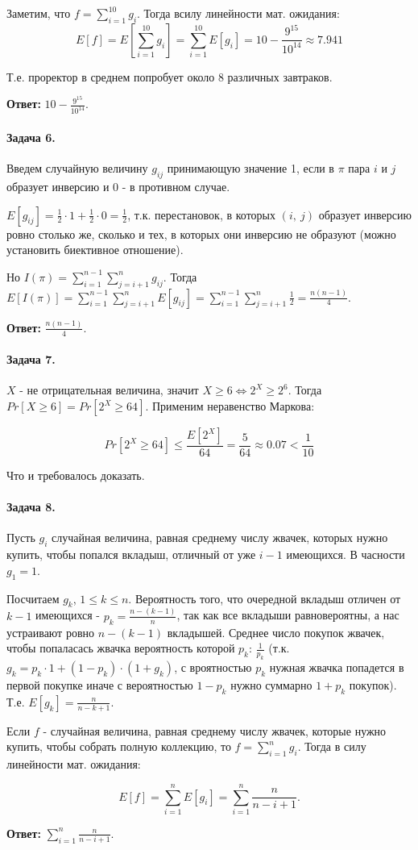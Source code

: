 \documentclass{article}
\newcommand{\pair}[2]{(#1,\ #2)}
\newcommand{\half}[1]{\frac{#1}{2}}
\begin{document}
    Заметим, что $f = \sum_{i=1}^{10}g_i$. Тогда всилу линейности мат. ожидания:
    $$ E[f] = 
    E[\sum_{i=1}^{10} g_i] = \sum_{i=1}^{10} E[g_i] = 10 - \frac{9^{15}}{10^{14}} \approx 7.941 $$

    Т.е. проректор в среднем попробует около 8 различных завтраков.

    \textbf{Ответ:} $10 - \frac{9^{15}}{10^{14}}$.


    \paragraph{Задача 6.}
    Введем случайную величину $g_{ij}$ принимающую значение 1, если в $\pi$
    пара $i$ и $j$ образует инверсию и 0 - в противном случае.

    $E[g_{ij}] = \frac{1}{2} \cdot 1 + \frac{1}{2} \cdot 0 = \half{1}$, т.к. перестановок, в которых $\pair{i}{j}$ образует инверсию ровно столько же, сколько и тех, в которых они инверсию не образуют (можно установить биективное отношение).

    Но $I({\pi}) = \sum_{i=1}^{n - 1}\sum_{j=i + 1}^{n}g_{ij}$. Тогда 
    $E[I(\pi)] = \sum_{i=1}^{n - 1}\sum_{j=i + 1}^{n}E[g_{ij}] 
    = \sum_{i=1}^{n - 1}\sum_{j=i + 1}^{n} \half{1} = \frac{n(n-1)}{4}$.

    \textbf{Ответ:} $\frac{n(n-1)}{4}$.

    \paragraph{Задача 7.}
    $X$ - не отрицательная величина, значит $X \ge 6 \Leftrightarrow 2^X \ge 2^6.$ Тогда $Pr[X \ge 6] = Pr[2^X \ge 64]$. Применим неравенство Маркова:

    $$ Pr[2^X \ge 64] \le \frac{E[2^X]}{64} = \frac{5}{64} \approx 0.07 < \frac{1}{10}$$

    Что и требовалось доказать.

    \paragraph{Задача 8.}
    Пусть $g_i$ случайная величина, равная среднему числу жвачек, которых нужно купить, чтобы попался вкладыш, отличный от уже $i - 1$ имеющихся. В часности $g_1 = 1$.

    Посчитаем $g_k$, $1 \le k \le n$. Вероятность того, что очередной вкладыш отличен от $k - 1$ имеющихся - $p_k = \frac{n - (k - 1)}{n}$, так как все вкладыши равновероятны, а нас устраивают ровно $n - (k - 1)$ вкладышей. Среднее число покупок жвачек, чтобы попаласась жвачка вероятность которой $p_k$: $\frac{1}{p_k}$ (т.к. $g_k = p_k \cdot 1 + (1 - p_k) \cdot (1 + g_k)$, с вроятностью $p_k$ нужная жвачка попадется в первой покупке иначе с вероятностью $1 - p_k$ нужно суммарно $1 + p_k$ покупок). Т.е. $E[g_k] = \frac{n}{n - k + 1}$.

    Если $f$ - случайная величина, равная среднему числу жвачек, которые нужно купить, чтобы собрать полную коллекцию, то $f = \sum_{i=1}^{n}g_i$. Тогда в силу линейности мат. ожидания:

    $$ E[f] = \sum_{i=1}^{n} E[g_i] = \sum_{i=1}^{n} \frac{n}{n - i + 1}.$$

    \textbf{Ответ:} $\sum_{i=1}^{n} \frac{n}{n - i + 1}$.
 
\end{document}
